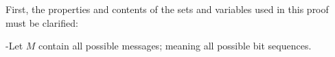 \documentclass[12pt]{report}
\begin{document}
%



%


First, the properties and contents of the sets and variables used in this proof must be clarified:

-Let $M$ contain all possible messages; meaning all possible bit sequences.
\end{document}
